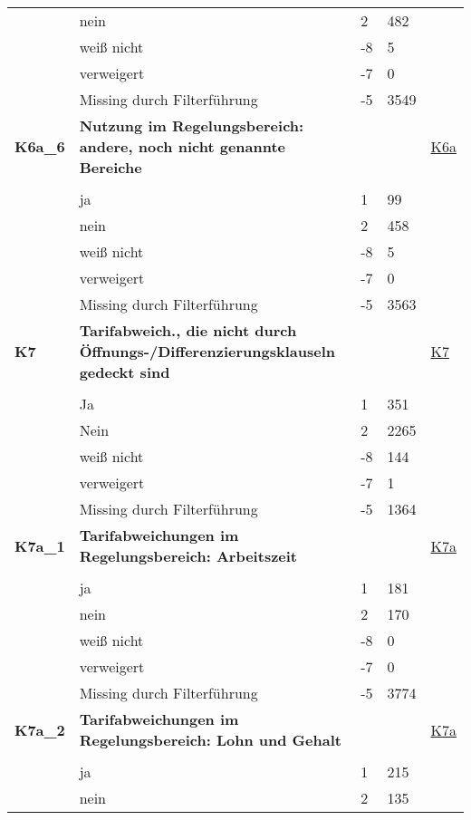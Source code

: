 \begin{longtable}{| L{2.5cm} | L{8.25cm}| C{1.5cm} | R{1.25cm} | C{2.25cm} |  }
   & nein & 2 & 482 &  \\ 
   & weiß nicht & -8 & 5 &  \\ 
   & verweigert & -7 & 0 &  \\ 
   & Missing durch Filterführung & -5 & 3549 &  \\ 
   \midrule
\textbf{K6a\_6}\label{var:suf:K6a:6} & \textbf{Nutzung im Regelungsbereich: andere, noch nicht genannte Bereiche} &  &  & \hyperref[K6a]{K6a} \\ 
   &  &  &  &  \\ 
   & ja & 1 & 99 &  \\ 
   & nein & 2 & 458 &  \\ 
   & weiß nicht & -8 & 5 &  \\ 
   & verweigert & -7 & 0 &  \\ 
   & Missing durch Filterführung & -5 & 3563 &  \\ 
   \midrule
\textbf{K7}\label{var:suf:K7} & \textbf{Tarifabweich., die nicht durch Öffnungs-/Differenzierungsklauseln gedeckt sind} &  &  & \hyperref[K7]{K7} \\ 
   &  &  &  &  \\ 
   & Ja & 1 & 351 &  \\ 
   & Nein & 2 & 2265 &  \\ 
   & weiß nicht & -8 & 144 &  \\ 
   & verweigert & -7 & 1 &  \\ 
   & Missing durch Filterführung & -5 & 1364 &  \\ 
   \midrule
\textbf{K7a\_1}\label{var:suf:K7a:1} & \textbf{Tarifabweichungen im Regelungsbereich: Arbeitszeit} &  &  & \hyperref[K7a]{K7a} \\ 
   &  &  &  &  \\ 
   & ja & 1 & 181 &  \\ 
   & nein & 2 & 170 &  \\ 
   & weiß nicht & -8 & 0 &  \\ 
   & verweigert & -7 & 0 &  \\ 
   & Missing durch Filterführung & -5 & 3774 &  \\ 
   \midrule
\textbf{K7a\_2}\label{var:suf:K7a:2} & \textbf{Tarifabweichungen im Regelungsbereich: Lohn und Gehalt} &  &  & \hyperref[K7a]{K7a} \\ 
   &  &  &  &  \\ 
   & ja & 1 & 215 &  \\ 
   & nein & 2 & 135 &  \\ 

\end{longtable}
